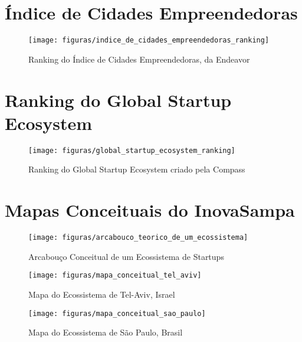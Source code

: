 \begin{anexosenv}

\partanexos

\chapter{Índice de Cidades Empreendedoras}

\begin{figure}[!htb]
\centering
\texttt{[image: figuras/indice\_de\_cidades\_empreendedoras\_ranking]}
\caption{Ranking do Índice de Cidades Empreendedoras, da Endeavor}
\label{figure:indice_de_cidades_empreendedoras_ranking}
\end{figure}

\chapter{Ranking do Global Startup Ecosystem}

\begin{figure}[!htb]
\centering
\texttt{[image: figuras/global\_startup\_ecosystem\_ranking]}
\caption{Ranking do Global Startup Ecosystem criado pela Compass}
\label{figure:global_startup_ecosystem_ranking}
\end{figure}

\chapter{Mapas Conceituais do InovaSampa}
\label{anexo:mapas_concentuais_do_inovasampa}

\begin{figure}[!htb]
	\centering
	\texttt{[image: figuras/arcabouco\_teorico\_de\_um\_ecossistema]}
	\caption{Arcabouço Conceitual de um Ecossistema de Startups}
	\label{figure:arcabouco_teorico_de_um_ecossistema}
\end{figure}

\begin{figure}[!htbp]
	\centering
	\texttt{[image: figuras/mapa\_conceitual\_tel\_aviv]}
	\caption{Mapa do Ecossistema de Tel-Aviv, Israel}
	\label{figure:mapa_conceitual_tel_aviv}
\end{figure}

\begin{figure}[!htbp]
	\centering
	\texttt{[image: figuras/mapa\_conceitual\_sao\_paulo]}
	\caption{Mapa do Ecossistema de São Paulo, Brasil}
	\label{figure:mapa_conceitual_sao_paulo}
\end{figure}

\end{anexosenv}


